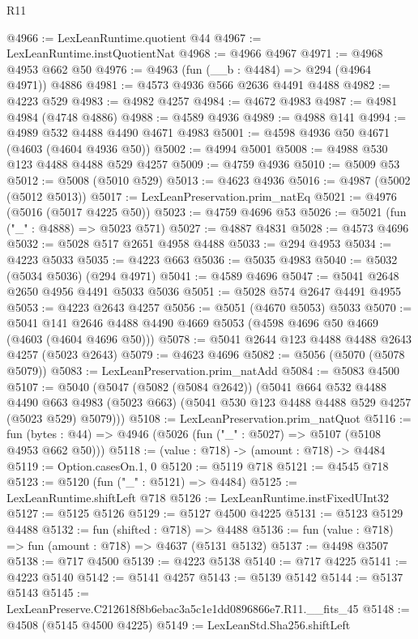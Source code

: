 \begin{lexlean}{R11}
\begin{coremodule}
@4966 := LexLeanRuntime.quotient @44
@4967 := LexLeanRuntime.instQuotientNat
@4968 := @4966 @4967
@4971 := @4968 @4953 @662 @50
@4976 := @4963 (fun (__b : @4484) => @294 (@4964 @4971)) @4886
@4981 := @4573 @4936 @566 @2636 @4491 @4488
@4982 := @4223 @529
@4983 := @4982 @4257
@4984 := @4672 @4983
@4987 := @4981 @4984 (@4748 @4886)
@4988 := @4589 @4936
@4989 := @4988 @141
@4994 := @4989 @532 @4488 @4490 @4671 @4983
@5001 := @4598 @4936 @50 @4671 (@4603 (@4604 @4936 @50))
@5002 := @4994 @5001
@5008 := @4988 @530 @123 @4488 @4488 @529 @4257
@5009 := @4759 @4936
@5010 := @5009 @53
@5012 := @5008 (@5010 @529)
@5013 := @4623 @4936
@5016 := @4987 (@5002 (@5012 @5013))
@5017 := LexLeanPreservation.prim_natEq
@5021 := @4976 (@5016 (@5017 @4225 @50))
@5023 := @4759 @4696 @53
@5026 := @5021 (fun ("_" : @4888) => @5023 @571)
@5027 := @4887 @4831
@5028 := @4573 @4696
@5032 := @5028 @517 @2651 @4958 @4488
@5033 := @294 @4953
@5034 := @4223 @5033
@5035 := @4223 @663
@5036 := @5035 @4983
@5040 := @5032 (@5034 @5036) (@294 @4971)
@5041 := @4589 @4696
@5047 := @5041 @2648 @2650 @4956 @4491 @5033 @5036
@5051 := @5028 @574 @2647 @4491 @4955
@5053 := @4223 @2643 @4257
@5056 := @5051 (@4670 @5053) @5033
@5070 := @5041 @141 @2646 @4488 @4490 @4669 @5053 (@4598 @4696 @50 @4669 (@4603 (@4604 @4696 @50)))
@5078 := @5041 @2644 @123 @4488 @4488 @2643 @4257 (@5023 @2643)
@5079 := @4623 @4696
@5082 := @5056 (@5070 (@5078 @5079))
@5083 := LexLeanPreservation.prim_natAdd
@5084 := @5083 @4500
@5107 := @5040
    (@5047
      (@5082 (@5084 @2642))
      (@5041
        @664
        @532
        @4488
        @4490
        @663
        @4983
        (@5023 @663)
        (@5041 @530 @123 @4488 @4488 @529 @4257 (@5023 @529) @5079)))
@5108 := LexLeanPreservation.prim_natQuot
@5116 := fun (bytes : @44) => @4946 (@5026 (fun ("_" : @5027) => @5107 (@5108 @4953 @662 @50)))
@5118 := (value : @718) -> (amount : @718) -> @4484
@5119 := Option.casesOn.{1, 0}
@5120 := @5119 @718
@5121 := @4545 @718
@5123 := @5120 (fun ("_" : @5121) => @4484)
@5125 := LexLeanRuntime.shiftLeft @718
@5126 := LexLeanRuntime.instFixedUInt32
@5127 := @5125 @5126
@5129 := @5127 @4500 @4225
@5131 := @5123 @5129 @4488
@5132 := fun (shifted : @718) => @4488
@5136 := fun (value : @718) => fun (amount : @718) => @4637 (@5131 @5132)
@5137 := @4498 @3507
@5138 := @717 @4500
@5139 := @4223 @5138
@5140 := @717 @4225
@5141 := @4223 @5140
@5142 := @5141 @4257
@5143 := @5139 @5142
@5144 := @5137 @5143
@5145 := LexLeanPreserve.C212618f8b6ebac3a5c1e1dd0896866e7.R11.__fits_45
@5148 := @4508 (@5145 @4500 @4225)
@5149 := LexLeanStd.Sha256.shiftLeft

\end{coremodule}
\end{lexlean}
